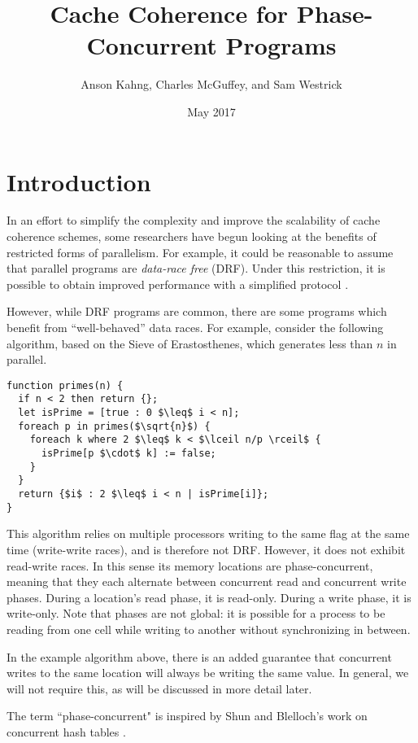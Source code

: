 \documentclass{article}
\title{Cache Coherence for Phase-Concurrent Programs}
\author{Anson Kahng, Charles McGuffey, and Sam Westrick}
\date{May 2017}
\begin{document}
\newcommand{\todo}[1]{{\color{red} [[TODO: {#1}]]}}

\maketitle

\section{Introduction}

In an effort to simplify the complexity and improve the scalability of cache coherence schemes, some researchers have begun looking at the benefits of restricted forms of parallelism. For example, it could be reasonable to assume that parallel programs are \textit{data-race free} (DRF). Under this restriction, it is possible to obtain improved performance with a simplified protocol \cite{choi2010denovo} \cite{ros2012complexity}.

However, while DRF programs are common, there are some programs which benefit from ``well-behaved'' data races. For example, consider the following algorithm, based on the Sieve of Erastosthenes, which generates less than $n$ in parallel.

\begin{lstlisting}
function primes(n) {
  if n < 2 then return {};
  let isPrime = [true : 0 $\leq$ i < n];
  foreach p in primes($\sqrt{n}$) {
    foreach k where 2 $\leq$ k < $\lceil n/p \rceil$ {
      isPrime[p $\cdot$ k] := false;
    }
  }
  return {$i$ : 2 $\leq$ i < n | isPrime[i]};
}
\end{lstlisting}

This algorithm relies on multiple processors writing to the same flag at the same time (write-write races), and is therefore not DRF. However, it does not exhibit read-write races. In this sense its memory locations are phase-concurrent, meaning that they each alternate between concurrent read and concurrent write phases. During a location's read phase, it is read-only. During a write phase, it is write-only. Note that phases are not global: it is possible for a process to be reading from one cell while writing to another without synchronizing in between.

In the example algorithm above, there is an added guarantee that concurrent writes to the same location will always be writing the same value. In general, we will not require this, as will be discussed in more detail later.

The term ``phase-concurrent" is inspired by Shun and Blelloch's work on concurrent hash tables \cite{shun2014phase}.
\end{document}
